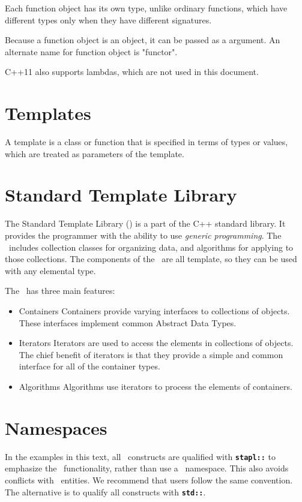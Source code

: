 \documentclass{report}
\begin{document}
Each function object has its own type, unlike ordinary functions, which
have different types only when they have different signatures.

Because a function object is an object, it can be passed as a argument.
An alternate name for function object is "functor".

C++11 also supports lambdas, which are not used in this document.

\section{Templates}

A template is a class or function that is specified in terms of types
or values, which are treated as parameters of the template.

\section{Standard Template Library}

The Standard Template Library (\stl) is a part of the C++ standard library.
It provides the programmer with the ability to use \emph{generic programming}.
The \stl\ includes collection classes for organizing data, and algorithms
for applying to those collections.  The components of the \stl\ are all
template, so they can be used with any elemental type.

The \stl\ has three main features:
\begin{itemize}
\item
Containers
\newline
Containers provide varying interfaces to collections of objects.
These interfaces implement common Abstract Data Types.
\item
Iterators
\newline
Iterators are used to access the elements in collections of objects.
The chief benefit of iterators is that they provide a simple and common
interface for all of the container types.
\item
Algorithms
\newline
Algorithms use iterators to process the elements of containers.
\end{itemize}

\section{Namespaces}

In the examples in this text, all \stapl\ constructs are qualified with
\texttt{{\bf stapl::}}
to emphasize the \stapl\ functionality, rather than use a
\stapl\ namespace.
This also avoids conflicts with \stl\ entities.  We recommend that users
follow the same convention.  The alternative is to qualify all
constructs with
\texttt{{\bf std::}}.
\end{document}
